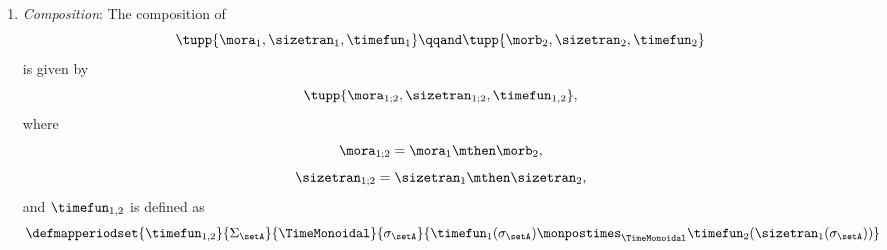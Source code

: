 \begin{definition}
\begin{enumerate}
        \item \emph{Composition}: The composition of
              \begin{equation}
                  \tupp{\mora_1, \sizetran_1,  \timefun_1  }
                  \qqand
                  \tupp{\morb_2, \sizetran_2,  \timefun_2  }
              \end{equation}
              is given by
              \begin{equation}
                  \tupp{
                      \mora_{1;2},
                      \sizetran_{1;2},
                      \timefun_{1,2}
                  },
              \end{equation}
              where
              \begin{equation}
                  \mora_{1;2} = \mora_1 \mthen \morb_2,
              \end{equation}
              \begin{equation}
                  \sizetran_{1;2} = \sizetran_1 \mthen \sizetran_2,
              \end{equation}
              and $\timefun_{1,2}$ is defined as
              \begin{equation}
                  \defmapperiodset{
                      \timefun_{1,2}
                  }{
                      \Sigma_{\setA}
                  }{
                      \TimeMonoidal
                  }{
                      \sigma_{\setA}
                  }{
                      \timefun_1(\sigma_{\setA}) \monpostimes_{\TimeMonoidal} \timefun_2(\sizetran_1(\sigma_{\setA}))
                  }
              \end{equation}
    \end{enumerate}
\end{definition}

